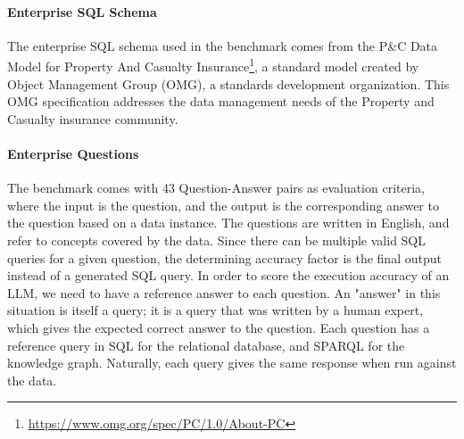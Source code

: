 \documentclass[11pt]{article}
\begin{document}
\paragraph{Enterprise SQL Schema}
The enterprise SQL schema used in the benchmark comes from the P\&C Data Model for Property And Casualty Insurance\footnote{\url{https://www.omg.org/spec/PC/1.0/About-PC}}, a standard model created by Object Management Group (OMG), a standards development organization.  
This OMG specification addresses the data management needs of the Property and Casualty insurance community.


\paragraph{Enterprise Questions}
The benchmark comes with 43 Question-Answer pairs as evaluation criteria, where the input is the question, and the output is the corresponding answer to the question based on a data instance.
The questions are written in English, and refer to concepts covered by the data. 
Since there can be multiple valid SQL queries for a given question, the determining accuracy factor is the final output instead of a generated SQL query. 
In order to score the execution accuracy of an LLM, we need to have a reference answer to each question. 
An "answer" in this situation is itself a query; it is a query that was written by a human expert, which gives the expected correct answer to the question.  
Each question has a reference query in SQL for the relational database, and SPARQL for the knowledge graph. 
Naturally, each query gives the same response when run against the data. 
\end{document}
